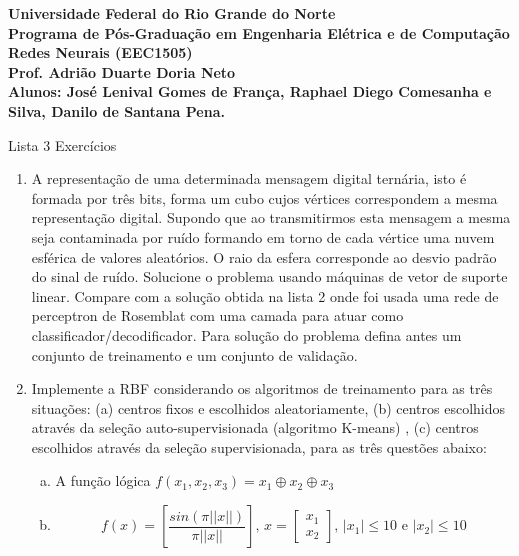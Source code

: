 \documentclass[a4paper,oneside,12pt]{article}
\begin{document}
\bfseries
\noindent
Universidade Federal do Rio Grande do Norte \\
Programa de P\'os-Gradua\c{c}\~ao em Engenharia El\'etrica e de Computa\c{c}\~ao \\
Redes Neurais (EEC1505) \\
Prof. Adri\~ao Duarte Doria Neto \\
Alunos: Jos\'e Lenival Gomes de Fran\c{c}a, Raphael Diego Comesanha e Silva, Danilo de Santana Pena.
\mdseries

\begin{center}
Lista 3 Exerc\'icios
\end{center}

\begin{enumerate}[1.]
\item A representa\c{c}\~ao de uma determinada mensagem digital tern\'aria, isto \'e formada por tr\^es bits, forma um cubo cujos v\'ertices correspondem a mesma representa\c{c}\~ao digital. Supondo que ao transmitirmos esta mensagem a mesma seja contaminada por ru\'ido formando em torno de cada v\'ertice uma nuvem esf\'erica de valores aleat\'orios. O raio da esfera corresponde ao desvio padr\~ao do sinal de ru\'ido. Solucione o problema usando m\'aquinas de vetor de suporte linear. Compare com a solu\c{c}\~ao obtida na lista 2 onde foi usada uma rede de perceptron de Rosemblat com uma camada para atuar como classificador/decodificador. Para solu\c{c}\~ao do problema defina antes um conjunto de treinamento e um conjunto de valida\c{c}\~ao. \\
%
%

\item Implemente a RBF considerando os algoritmos de treinamento para as tr\^{e}s situa\c{c}\~oes: (a) centros fixos e escolhidos aleatoriamente, (b) centros escolhidos atrav\'es da sele\c{c}\~ao auto-supervisionada (algoritmo K-means) , (c) centros escolhidos atrav\'es da sele\c{c}\~ao supervisionada, para as tr\^es quest\~oes abaixo: \\

\begin{enumerate}[a)]
\item A fun\c{c}\~ao l\'ogica $f(x_{1}, x_{2}, x_{3}) = x_{1} \oplus x_{2} \oplus x_{3}$

\item \begin{equation*}
f(x) = \left[ \frac{sin(\pi ||x||)}{\pi ||x||} \right] \text{, } x = \begin{bmatrix}
x_{1} \\
x_{2}
\end{bmatrix} \text{, } |x_{1}| \leq 10 \text{ e } |x_{2}| \leq 10
\end{equation*}


\end{enumerate}
\end{enumerate}
\end{document}
